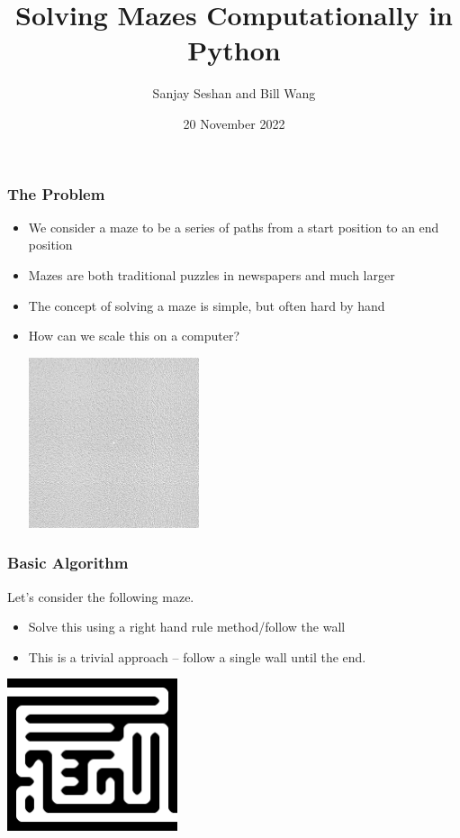 \documentclass{beamer}
\title{Solving Mazes Computationally in Python}
\author{Sanjay Seshan and Bill Wang}
\institute{MIT Splash}
\date{20 November 2022}
\begin{document}
\frame{\titlepage}

\begin{frame}
\frametitle{The Problem}
\begin{itemize}
    \item We consider a maze to be a series of paths from a start position to an end position
    \item Mazes are both traditional puzzles in newspapers and much larger
    \item The concept of solving a maze is simple, but often hard by hand
    \item How can we scale this on a computer?
    
    \includegraphics[width=5cm]{figures/lgg_graph.jpg}
\end{itemize}

\end{frame}

\begin{frame}
    \frametitle{Basic Algorithm}
    Let's consider the following maze.
    \begin{itemize}
        \item Solve this using a right hand rule method/follow the wall
        \item This is a trivial approach -- follow a single wall until the end.
        
    \end{itemize}

    \includegraphics[width=5cm]{figures/maze_bfs_lg.png}

    
    \end{frame}
\end{document}
